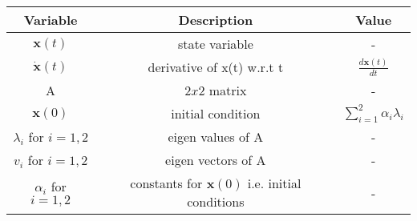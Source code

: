 \begin{tabular}{|c|c|c|} 
      \hline
\textbf{Variable}& \textbf{Description}& \textbf{Value}\\\hline
	 $\bm{x}(t)$ & state variable & - \\\hline
         $\dot{\bm{x}}(t)$ & derivative of x(t) w.r.t t & $\frac{d\bm{x}(t)}{dt}$\\\hline  
         A & $2x2$ matrix & -\\\hline
         $\bm{x}(0)$ & initial condition & $\sum_{i=1}^{2}\alpha _i\lambda _i$ \\\hline
         $\lambda _i$ for $i = 1, 2$ & eigen values of A & - \\\hline
         $v_i$ for $i = 1, 2$ & eigen vectors of A & - \\\hline
         $\alpha _i$ for $i = 1, 2$ & constants for $\bm{x}(0)$ i.e. initial conditions & - \\\hline
    \end{tabular}
